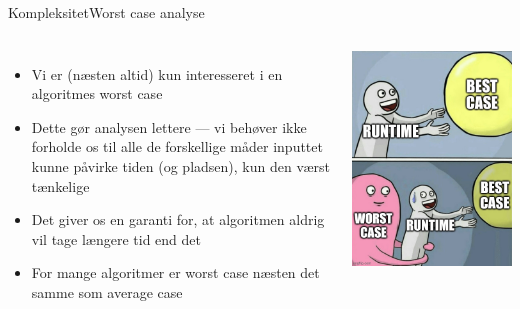 \documentclass[aspectratio=1610]{beamer}
\begin{document}
\begin{frame}{Kompleksitet}{Worst case analyse}

    \begin{columns}
        \begin{itemize}
            \item Vi er (næsten altid) kun interesseret i en algoritmes worst
                case
            \item Dette gør analysen lettere --- vi behøver ikke forholde os
                til alle de forskellige måder inputtet kunne påvirke tiden (og
                pladsen), kun den værst tænkelige
            \item Det giver os en garanti for, at algoritmen aldrig vil tage
                længere tid end det
            \item For mange algoritmer er worst case næsten det samme som
                average case
        \end{itemize}

        \includegraphics[width=\linewidth]{worst-case}
    \end{columns}
    
\end{frame}
\end{document}

